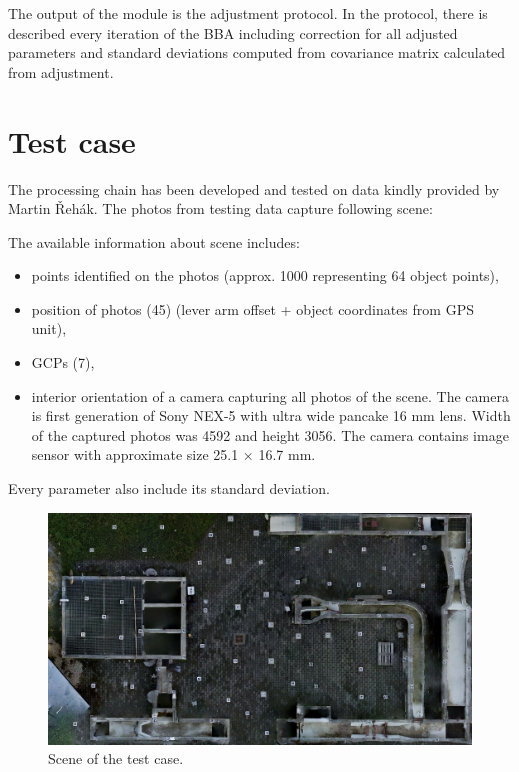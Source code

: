 \documentclass[a4paper,12pt]{article}
\begin{document}
The output of the module is the adjustment protocol. In the protocol, there
is described every iteration of the BBA including correction for all adjusted parameters and standard deviations computed from 
covariance matrix calculated from adjustment. 


\section{Test case}
\label{sec:test_case}

The processing chain has been developed and tested on data kindly provided by Martin Řehák. 
The photos from testing data capture following scene:

\noindent The available information about scene includes:

\begin{itemize}
\item points identified on the photos (approx. 1000 representing 64 object points),
\item position of photos (45) (lever arm offset + object coordinates from GPS unit),
\item GCPs (7),
\item interior orientation of a camera capturing all photos of the scene.
The camera is first generation of Sony NEX-5 with ultra wide pancake 16 mm lens.
Width of the captured photos was 4592 and height 3056.
The camera contains image sensor with approximate size 25.1 × 16.7 mm.
\end{itemize}
Every parameter also include its standard deviation. 

\begin{center}
 \begin{figure}[!h]
    \includegraphics[scale=0.4]{figures/calib_field.png}
    \caption{Scene of the test case.}
    \label{fig:test_case}
\end{figure}
\end{center}
\end{document}
